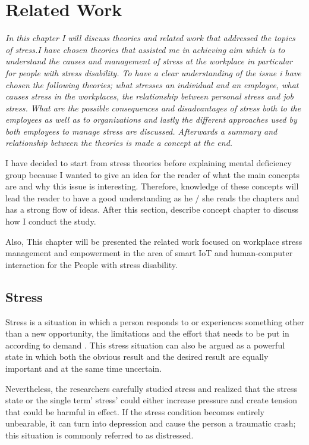 \chapter{Related Work}
\textit{In this chapter I will discuss theories and related work that addressed  the  topics  of stress.I have chosen theories that  assisted  me in  achieving aim  which  is  to  understand the causes and management  of  stress  at  the  workplace  in  particular  for people with stress disability.  To have a clear understanding of the issue i have chosen the following theories; what stresses an individual and  an  employee, what  causes  stress  in  the  workplaces,  the  relationship  between  personal stress and job stress. What are the possible consequences and disadvantages of stress both to the  employees  as  well  as  to  organizations  and  lastly  the  different  approaches used  by  both employees to  manage  stress  are  discussed.  Afterwards  a  summary  and relationship between the theories is made a concept at the end.}
\vspace{5mm}

I have  decided  to  start  from  stress theories before explaining mental deficiency group because  I wanted  to give  an  idea  for  the  reader  of what the main concepts are  and why  this issue is interesting. Therefore, knowledge of these concepts will lead the reader to have a good understanding as he / she reads the chapters and has a strong flow of ideas.  After this section,  describe concept chapter to discuss how I conduct the study.

Also, This chapter will be presented the related work focused on workplace stress management and empowerment in the area of smart \ac{IoT} and human-computer interaction for the People with stress disability.
\section{Stress}
Stress is a situation in which a person responds to or experiences something other than a new opportunity, the limitations and the effort that needs to be put in according to demand \citep{Naturale2007SecondaryField} . This stress situation can also be argued as a powerful state in which both the obvious result and the desired result are equally important and at the same time uncertain.

Nevertheless, the researchers carefully studied stress and realized that the stress state or the single term' stress' could either increase pressure and create tension that could be harmful in effect. If the stress condition becomes entirely unbearable, it can turn into depression and cause the person a traumatic crash; this situation is commonly referred to as distressed. 

